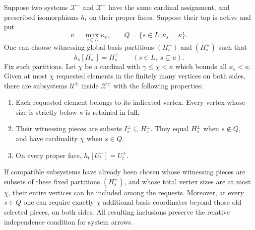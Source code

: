 \begin{lemma}
\label{tail:support-subcubes}
Suppose two systems $\mathcal X^-$ and $\mathcal X^+$ have the
same cardinal assignment, and prescribed isomorphisms $h_t$ on
their proper faces.  Suppose their top is active and put
\[
 \kappa=\max_{s\in L}\kappa_s,\qquad
 Q=\{s\in L:\kappa_s=\kappa\}.
\]
One can choose witnessing global basis partitions
$(H_s^-)$ and $(H_s^+)$ such that
\begin{equation}
 h_s[H_s^-]=H_s^+\qquad(s\in L,\ s\subsetneq a).
 \label{tail:proper-basis-choice}
\end{equation}
Fix such partitions.  Let $\chi$ be a cardinal with
$\gamma\leq\chi<\kappa$ which bounds all $\kappa_s<\kappa$.
Given at most $\chi$ requested elements in the finitely many
vertices on both sides, there are subsystems $\mathcal U^\pm$
inside $\mathcal X^\pm$ with the following properties:
\begin{enumerate}
\item Each requested element belongs to its indicated vertex.
      Every vertex whose size is strictly below $\kappa$ is
      retained in full.
\item Their witnessing pieces are subsets
      $I_s^\pm\subseteq H_s^\pm$.  They equal $H_s^\pm$ when
      $s\notin Q$, and have cardinality $\chi$ when $s\in Q$.
\item On every proper face,
      $h_t[U_t^-]=U_t^+$.
\end{enumerate}
If compatible subsystems have already been chosen whose witnessing
pieces are subsets of these fixed partitions $(H_s^\pm)$, and whose
total vertex sizes are at most $\chi$, their entire vertices can be
included among the requests.  Moreover, at every $s\in Q$ one can
require exactly $\chi$ additional basis coordinates beyond those
old selected pieces, on both sides.  All resulting inclusions
preserve the relative independence condition for system arrows.
\end{lemma}

